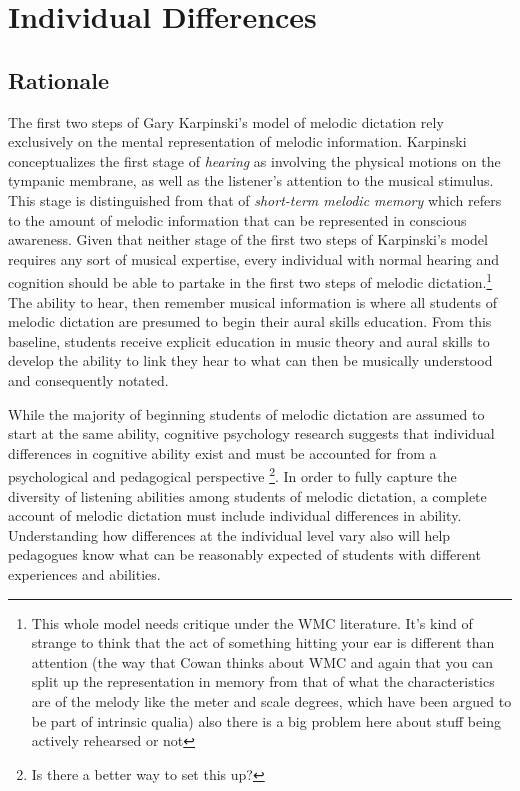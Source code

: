 \documentclass[]{book}
\let\rmarkdownfootnote\footnote%
\def\footnote{\protect\rmarkdownfootnote}
\begin{document}
\hypertarget{individual-differences}{%
\chapter{Individual Differences}\label{individual-differences}}

\hypertarget{rationale-1}{%
\section{Rationale}\label{rationale-1}}

The first two steps of Gary Karpinski's model of melodic dictation \citep{karpinskiAuralSkillsAcquisition2000, karpinskiModelMusicPerception1990} rely exclusively on the mental representation of melodic information.
Karpinski conceptualizes the first stage of \emph{hearing} as involving the physical motions on the tympanic membrane, as well as the listener's attention to the musical stimulus.
This stage is distinguished from that of \emph{short-term melodic memory} which refers to the amount of melodic information that can be represented in conscious awareness.
Given that neither stage of the first two steps of Karpinski's model requires any sort of musical expertise, every individual with normal hearing and cognition should be able to partake in the first two steps of melodic dictation.\footnote{This whole model needs critique under the WMC literature. It's kind of strange to think that the act of something hitting your ear is different than attention (the way that Cowan thinks about WMC and again that you can split up the representation in memory from that of what the characteristics are of the melody like the meter and scale degrees, which have been argued to be part of intrinsic qualia) also there is a big problem here about stuff being actively rehearsed or not}
The ability to hear, then remember musical information is where all students of melodic dictation are presumed to begin their aural skills education.
From this baseline, students receive explicit education in music theory and aural skills to develop the ability to link they hear to what can then be musically understood and consequently notated.

While the majority of beginning students of melodic dictation are assumed to start at the same ability, cognitive psychology research suggests that individual differences in cognitive ability exist and must be accounted for from a psychological and pedagogical perspective \citep{cowanWorkingMemoryCapacity2005, ritchieIntelligenceAllThat2015}\footnote{Is there a better way to set this up?}.
In order to fully capture the diversity of listening abilities among students of melodic dictation, a complete account of melodic dictation must include individual differences in ability.
Understanding how differences at the individual level vary also will help pedagogues know what can be reasonably expected of students with different experiences and abilities.
\end{document}
